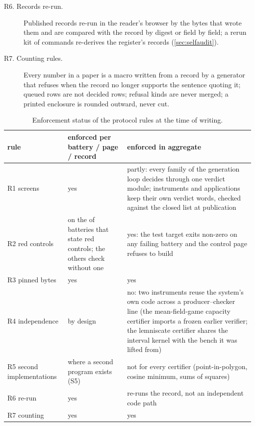 \documentclass[preprint,11pt,a4paper]{elsarticle}
\theoremstyle{definition}
\newcommand{\supp}[1]{S#1}
\begin{document}
\begin{description}
\item[R6. Records re-run.] Published records re-run in the reader's browser by the bytes that wrote them and are compared with the record by digest or field by field; a rerun kit of \MtKitCommands{} commands re-derives the register's records (\cref{sec:selfaudit}).
\item[R7. Counting rules.] Every number in a paper is a macro written from a record by a generator that refuses when the record no longer supports the sentence quoting it; queued rows are not decided rows; refusal kinds are never merged; a printed enclosure is rounded outward, never cut.
\end{description}

\begin{table}[htbp]
\centering\footnotesize
\caption{Enforcement status of the protocol rules at the time of writing.}
\label{tab:protocol}
\begin{tabular}{@{}L{2.8cm}L{3.6cm}L{5.3cm}@{}}
\toprule
rule & enforced per battery / page / record & enforced in aggregate \\
\midrule
R1 screens & yes & partly: every family of the generation loop decides through one verdict module; instruments and applications keep their own verdict words, checked against the closed list at publication \\
R2 red controls & on the \MtEvRedBatteries{} of \MtBatteries{} batteries that state red controls; the others check without one & yes: the test target exits non-zero on any failing battery and the control page refuses to build \\
R3 pinned bytes & yes & yes \\
R4 independence & by design & no: two instruments reuse the system's own code across a producer--checker line (the mean-field-game capacity certifier imports a frozen earlier verifier; the lemniscate certifier shares the interval kernel with the bench it was lifted from) \\
R5 second implementations & where a second program exists (\supp{5}) & not for every certifier (point-in-polygon, cosine minimum, sums of squares) \\
R6 re-run & yes & re-runs the record, not an independent code path \\
R7 counting & yes & yes \\
\bottomrule
\end{tabular}
\end{table}

\end{document}
